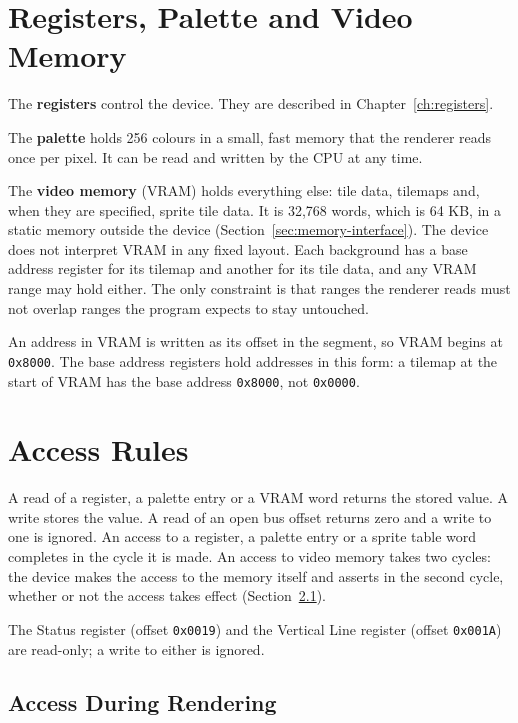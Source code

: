 \section{Registers, Palette and Video Memory}

The \textbf{registers} control the device. They are described in Chapter~\ref{ch:registers}.

The \textbf{palette} holds 256 colours in a small, fast memory that the renderer reads once per pixel. It can be read
and written by the CPU at any time.

The \textbf{video memory} (VRAM) holds everything else: tile data, tilemaps and, when they are specified, sprite tile
data. It is 32,768 words, which is 64 KB, in a static memory outside the device (Section~\ref{sec:memory-interface}).
The device does not interpret VRAM in any fixed layout. Each background has a base address register for its tilemap and
another for its tile data, and any VRAM range may hold either. The only constraint is that ranges the renderer reads
must not overlap ranges the program expects to stay untouched.

An address in VRAM is written as its offset in the segment, so VRAM begins at \texttt{0x8000}. The base address
registers hold addresses in this form: a tilemap at the start of VRAM has the base address \texttt{0x8000}, not
\texttt{0x0000}.

\section{Access Rules}

A read of a register, a palette entry or a VRAM word returns the stored value. A write stores the value. A read of an
open bus offset returns zero and a write to one is ignored. An access to a register, a palette entry or a sprite table
word completes in the cycle it is made. An access to video memory takes two cycles: the device makes the access to the
memory itself and asserts  in the second cycle, whether or not the access takes effect
(Section~\ref{sec:memory-vram-access}).

The Status register (offset \texttt{0x0019}) and the Vertical Line register (offset \texttt{0x001A}) are read-only; a
write to either is ignored.

\subsection{Access During Rendering}
\label{sec:memory-vram-access}

